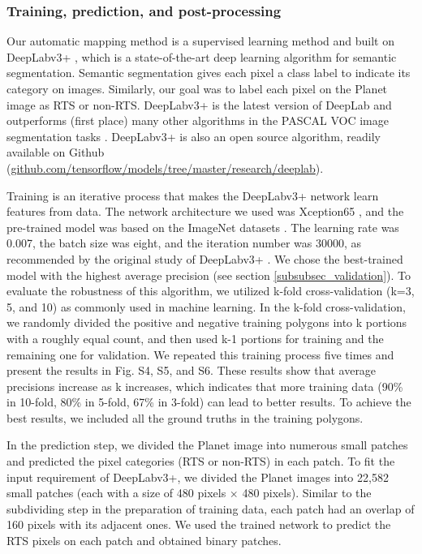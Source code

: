 \documentclass[authoryear,preprint,review,12pt]{elsarticle}
\begin{document}
\subsubsection{Training, prediction, and post-processing}
\label{subsubsec_deeplab}

Our automatic mapping method is a supervised learning method and built on DeepLabv3+ \citep{chen_encoder-decoder_2018}, which is a state-of-the-art deep learning algorithm for semantic segmentation. Semantic segmentation gives each pixel a class label to indicate its category on images. Similarly, our goal was to label each pixel on the Planet image as RTS or non-RTS. DeepLabv3+ is the latest version of DeepLab and outperforms (first place) many other algorithms in the PASCAL VOC image segmentation tasks \citep{everingham_pascal_2015}. DeepLabv3+ is also an open source algorithm, readily available on Github (\url{github.com/tensorflow/models/tree/master/research/deeplab}).

Training is an iterative process that makes the DeepLabv3+ network learn features from data. The network architecture we used was Xception65 \citep{chollet2017xception}, and the pre-trained model was based on the ImageNet datasets \citep{russakovsky2015imagenet}. The learning rate was 0.007, the batch size was eight, and the iteration number was 30000, as recommended by the original study of DeepLabv3+ \citep{chen_encoder-decoder_2018}. We chose the best-trained model with the highest average precision (see section \ref{subsubsec_validation}). To evaluate the robustness of this algorithm, we utilized k-fold cross-validation (k=3, 5, and 10)  as commonly used in machine learning. In the k-fold cross-validation, we randomly divided the positive and negative training polygons into k portions with a roughly equal count, and then used k-1 portions for training and the remaining one for validation. We repeated this training process five times and present the results in Fig. S4, S5, and S6. These results show that average precisions  increase as k increases, which indicates that more training data (90\% in 10-fold, 80\% in 5-fold, 67\% in 3-fold) can lead to better results. To achieve the best results, we included all the ground truths in the training polygons. 

In the prediction step, we divided the Planet image into numerous small patches and predicted the pixel categories (RTS or non-RTS) in each patch. To fit the input requirement of DeepLabv3+, we divided the Planet images into 22,582 small patches (each with a size of 480 pixels $\times$ 480 pixels). Similar to the subdividing step in the preparation of training data, each patch had an overlap of 160 pixels with its adjacent ones. We used the trained network to predict the RTS pixels on each patch and obtained binary patches. 
\end{document}
